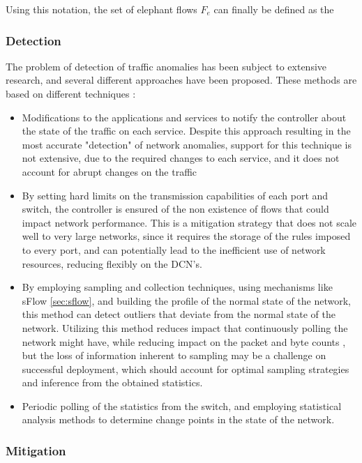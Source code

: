 \par Using this notation, the set of elephant flows $F_e$ can finally be defined as the 

\subsubsection{Detection}

The problem of detection of traffic anomalies has been subject to extensive research, and several different approaches have been proposed. These methods are
based on different techniques \cite {http://shiftleft.com/mirrors/www.hpl.hp.com/personal/Praveen_Yalagandula/papers/INFOCOM11.pdf}:

\begin {itemize}
    \item Modifications to the applications and services to notify the controller about the state of the traffic on each service. Despite this approach resulting
         in the most accurate "detection" of network anomalies, support for this technique is not extensive, due to the required changes to each service, 
         and it does not account for abrupt changes on the traffic
    \item By setting hard limits on the transmission capabilities of each port and switch, the controller is ensured of the non existence of flows that could 
        impact network performance. This is a mitigation strategy that does not scale well to very large networks, since it requires the storage of the rules
        imposed to every port, and can potentially lead to the inefficient use of network resources, reducing flexibly on the DCN's.
    \item By employing sampling and collection techniques, using mechanisms like sFlow \ref{sec:sflow}, and building the profile of the normal state of the network,
        this method can detect outliers that deviate from the normal state of the network. Utilizing this method reduces impact that continuously polling the network
        might have, while reducing impact on the packet and byte counts \cite {https://www.cert.org/flocon/2006/presentations/packet_sample_anomoly2006.pdf}, but 
        the loss of information inherent to sampling may be a challenge on successful deployment, which should account for optimal sampling 
        strategies and inference from the obtained statistics.
    \item Periodic polling of the statistics from the switch, and employing statistical analysis methods to determine change points in the state of the network.
\end {itemize}

\par 

\subsubsection{Mitigation}
